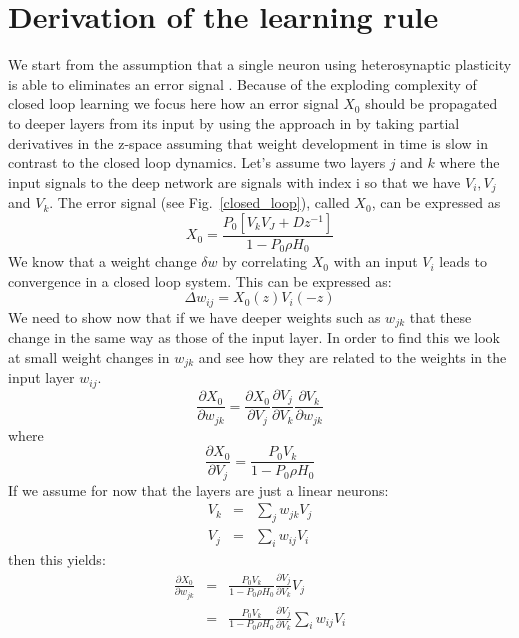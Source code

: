 \documentclass{article}
\begin{document}
\section{Derivation of the learning rule}
We start from the assumption that a single neuron using heterosynaptic
plasticity is able to eliminates an error signal
\cite{Porr2006ICO}. Because of the exploding complexity of closed loop
learning we focus here how an error signal $X_0$ should be propagated
to deeper layers from its input by using the approach in
\cite{Mehta1986} by taking partial derivatives in the z-space assuming
that weight development in time is slow in contrast to the closed loop
dynamics.  Let's assume two layers $j$ and $k$ where the input signals
to the deep network are signals with index i so that we have $V_i,
V_j$ and $V_k$. The error signal (see Fig.~\ref{closed_loop}), called
$X_0$, can be expressed as
\begin{equation}
  X_0 = \frac{P_0 \left[ V_k V_J + D z^{-1} \right]}{1-P_0 \rho H_0}
\end{equation}
We know that a weight change $\delta w$ by correlating $X_0$ with an input
$V_i$ leads to convergence in a closed loop system. This can be expressed
as:
\begin{equation}
  \Delta w_{ij} = X_0(z) V_i(-z)
\end{equation}
We need to show now that if we have deeper weights such as $w_{jk}$
that these change in the same way as those of the input layer. In
order to find this we look at small weight changes in $w_{jk}$ and see
how they are related to the weights in the input layer $w_{ij}$.
\begin{equation}
    \frac{\partial X_0}{\partial w_{jk}} =
    \frac{\partial X_0}{\partial V_j}
    \frac{\partial V_j}{\partial V_k}
    \frac{\partial V_k}{\partial w_{jk}}
\end{equation}    
where
\begin{equation}
\frac{\partial X_0}{\partial V_j} = \frac{P_0 V_k}{1-P_0 \rho H_0}
\end{equation}
If we assume for now that the layers are just a linear neurons:
\begin{eqnarray}
  V_k &=& \sum_j w_{jk} V_j \\
  V_j &=& \sum_i w_{ij} V_i
\end{eqnarray}
then this yields:
\begin{eqnarray}
    \frac{\partial X_0}{\partial w_{jk}} &=&
    \frac{P_0 V_k}{1-P_0 \rho H_0}
    \frac{\partial V_j}{\partial V_k}
    V_j \\
                                        &=&
    \frac{P_0 V_k}{1-P_0 \rho H_0}
    \frac{\partial V_j}{\partial V_k}
    \sum_i w_{ij} V_i
\end{eqnarray}    
\end{document}
